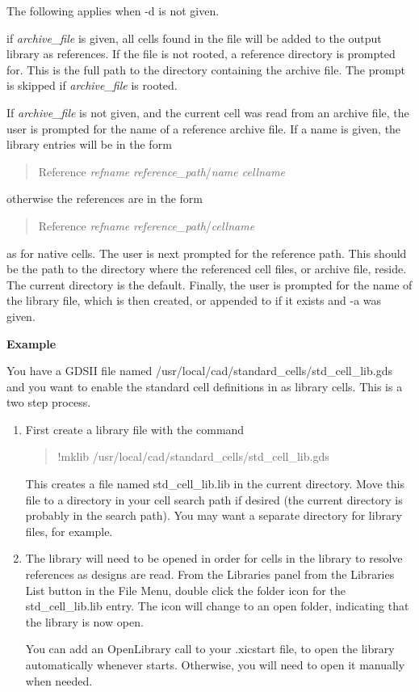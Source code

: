 The following applies when {\vt -d} is not given.

if {\it archive\_file} is given, all cells found in the file will be
added to the output library as references.  If the file is not rooted,
a reference directory is prompted for.  This is the full path to the
directory containing the archive file.  The prompt is skipped if
{\it archive\_file} is rooted.

If {\it archive\_file} is not given, and the current cell was read
from an archive file, the user is prompted for the name of a reference
archive file.  If a name is given, the library entries will be in the
form
\begin{quote}
{\vt Reference} {\it refname} {\it reference\_path\/}/{\it name cellname}
\end{quote}
otherwise the references are in the form
\begin{quote}
{\vt Reference} {\it refname} {\it reference\_path\/}/{\it cellname}
\end{quote}
as for native cells.  The user is next prompted for the reference
path.  This should be the path to the directory where the referenced
cell files, or archive file, reside.  The current directory is the
default.  Finally, the user is prompted for the name of the library
file, which is then created, or appended to if it exists and {\vt -a}
was given.

{\bf Example}

You have a GDSII file named
{\vt /usr/local/cad/standard\_cells/std\_cell\_lib.gds} and you
want to enable the standard cell definitions in {\Xic} as
library cells.  This is a two step process.

\begin{enumerate}
\item{First create a library file with the command
\begin{quote}
\vt !mklib /usr/local/cad/standard\_cells/std\_cell\_lib.gds
\end{quote}
This creates a file named {\vt std\_cell\_lib.lib} in the current
directory.  Move this file to a directory in your cell search path if
desired (the current directory is probably in the search path).  You
may want a separate directory for library files, for example.}

\item{The library will need to be opened in order for cells in the
library to resolve references as designs are read.  From the {\cb
Libraries} panel from the {\cb Libraries List} button in the {\cb File
Menu}, double click the folder icon for the {\vt std\_cell\_lib.lib}
entry.  The icon will change to an open folder, indicating that the
library is now open.

You can add an {\vt OpenLibrary} call to your {\vt .xicstart} file, to
open the library automatically whenever {\Xic} starts.  Otherwise, you
will need to open it manually when needed.}
\end{enumerate}

